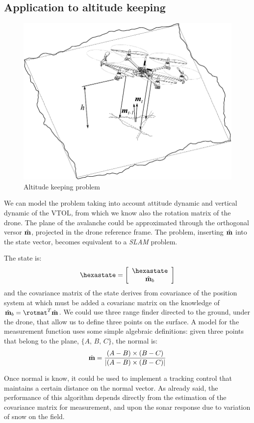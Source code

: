 \subsection{Application to altitude keeping}
\begin{figure}[h]
	\centering
	\includegraphics[scale=0.65]{ch3/img/altitude_keep.pdf}
	\caption{Altitude keeping problem}
	\forcerectofloat
\end{figure}
\FloatBarrier
We can model the problem taking into account attitude dynamic and vertical dynamic of the VTOL, from which we know also the rotation matrix of the drone. The plane of the avalanche could be approximated through the orthogonal versor $\hat{\mathbf{m}}$, projected in the drone reference frame. The problem, inserting $\hat{\mathbf{m}}$ into the state vector, becomes equivalent to a \emph{SLAM} problem.

The state is:
\renewcommand{\arraystretch}{1}
\begin{equation}
\hexastate = \vettore{\hexastate \\ \vers{m}_b}
\end{equation}
\renewcommand{\arraystretch}{1.75}
and the covariance matrix of the state derives from covariance of the position system at which must be added a covarianc matrix on the knowledge of ${\vers{m}_b = \rotmat^{T} \vers{m}}$. We could use three range finder directed to the ground, under the drone, that allow us to define three points on the surface. A model for the measurement function uses some simple algebraic definitions: given three points that belong to the plane, $\{A,\, B,\, C\}$, the normal is:
\begin{equation}
\hat{\mathbf{m}} = \dfrac{(A-B)\times(B-C)}{\left| (A-B)\times(B-C) \right|}
\end{equation}

Once normal is know, it could be used to implement a tracking control that maintains a certain distance on the normal vector. As already said, the performance of this algorithm depends directly from the estimation of the covariance matrix for measurement, and upon the sonar response due to variation of snow on the field.
